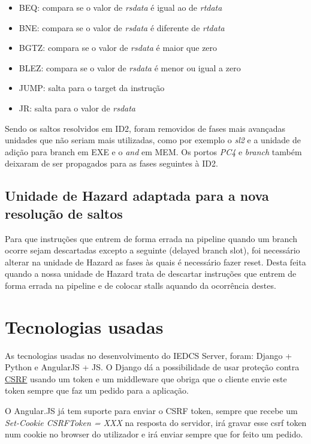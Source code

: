 \documentclass[pdftex,12pt,a4paper]{report}
\begin{document}
\begin{itemize}
\item BEQ: compara se o valor de \textit{rsdata} é igual ao de \textit{rtdata}
\item BNE: compara se o valor de \textit{rsdata} é diferente de \textit{rtdata} 
\item BGTZ: compara se o valor de \textit{rsdata} é maior que zero
\item BLEZ: compara se o valor de \textit{rsdata} é menor ou igual a zero
\item JUMP: salta para o target da instrução
\item JR: salta para o valor de \textit{rsdata}
\end{itemize} 

Sendo os saltos resolvidos em ID2, foram removidos de fases mais avançadas unidades que não seriam mais utilizadas, como por exemplo o \textit{sl2} e a unidade de adição para branch em EXE e o \textit{and} em MEM. Os portos \textit{PC4} e \textit{branch} também deixaram de ser propagados para as fases seguintes à ID2.

\subsection{Unidade de Hazard adaptada para a nova resolução de saltos}

Para que instruções que entrem de forma errada na pipeline quando um branch ocorre sejam descartadas excepto a seguinte (delayed branch slot), foi necessário alterar na unidade de Hazard as fases às quais é necessário fazer reset. Desta feita quando a nossa unidade de Hazard trata de descartar instruções que entrem de forma errada na pipeline e de colocar stalls aquando da ocorrência destes.

\section{Tecnologias usadas}

As tecnologias usadas no desenvolvimento do IEDCS Server, foram: Django + Python e AngularJS + JS. O Django dá a possibilidade de usar proteção contra \href{https://docs.djangoproject.com/en/1.8/ref/csrf/}{CSRF} usando um token e um middleware que obriga que o cliente envie este token sempre que faz um pedido para a aplicação.  

O Angular.JS já tem suporte para enviar o CSRF token, sempre que recebe um \textit{Set-Cookie CSRFToken = XXX} na resposta do servidor, irá gravar esse csrf token num cookie no browser do utilizador e irá enviar sempre que for feito um pedido.
\end{document}
